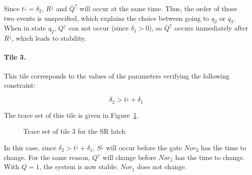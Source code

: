 \documentclass[a4paper,11pt]{article}
\begin{document}
Since $t^\downarrow = \delta_2$, $R^\downarrow$ and $\overline{Q}^\uparrow$ will occur at the same time.
Thus, the order of those two events is unspecified, which explains the choice between going to $q_2$ or $q_3$.
When in state $q_2$, $Q^\uparrow$ can not occur (since $\delta_1 > 0$), so $\overline{Q}^\uparrow$ occurs immediately after $R^\downarrow$, which leads to stability.


\paragraph*{Tile 3.}
This tile corresponds to the values of the parameters verifying the following constraint:

$$ \delta_2 > t^\downarrow + \delta_1 $$

The trace set of this tile is given in Figure~\ref{fig:sr_tile_3}.

\begin{figure}[ht]
\centering
\footnotesize

\caption{Trace set of tile 3 for the SR latch}
\label{fig:sr_tile_3}
\end{figure}

In this case, since $\delta_2 > t^\downarrow + \delta_1 $, $S^\downarrow$ will occur before the gate $\mathit{Nor}_2$ has the time to change.
For the same reason, $Q^\uparrow$ will change before $\mathit{Nor}_1$ has the time to change.
With $Q = 1$, the system is now stable: $\mathit{Nor}_1$ does not change.
\end{document}
